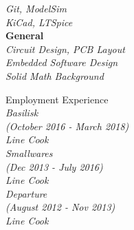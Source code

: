 \documentclass{article}
\newcommand\leftcolwidthvar{0.35}
\begin{document}
{\begin{minipage}[t]{\leftcolwidthvar \textwidth}
\begin{flushleft}
	\textsf{\textit{%
			Git, ModelSim\\\vspace{1pt}
			KiCad, LTSpice\\\vspace{1pt}}}
	\textbf{General\\\vspace{1pt}}
	\textsf{\textit{%
			Circuit Design, PCB Layout\\\vspace{1pt}
			Embedded Software Design\\\vspace{1pt}
			Solid Math Background\\}}	
\end{flushleft}
\vspace{0.5ex}
%
%
\begin{flushleft}
	\textsf{\Large Employment Experience}\\
	\smallskip
	\textsf{\textit{%
			Basilisk \\(October 2016 - March 2018)\\ Line Cook\\\vspace{2pt}
			Smallwares \\(Dec 2013 - July 2016)\\ Line Cook\\\vspace{2pt}
			Departure \\(August 2012 - Nov 2013)\\ Line Cook\\\vspace{2pt}}}
\end{flushleft}
\end{minipage}
}
\hfill
%
%
\end{document}
